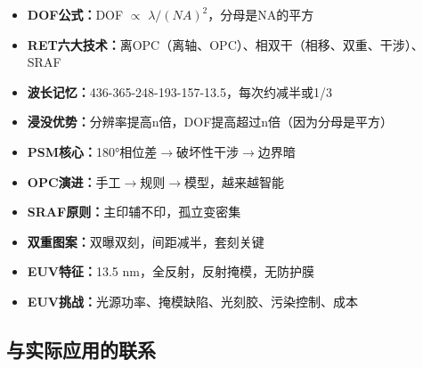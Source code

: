 \documentclass[UTF8,12pt,a4paper]{ctexart}
\begin{document}
\begin{itemize}
    \item \textbf{DOF公式：}DOF $\propto$ $\lambda/(NA)^2$，分母是NA的平方
    \item \textbf{RET六大技术：}离OPC（离轴、OPC）、相双干（相移、双重、干涉）、SRAF
    \item \textbf{波长记忆：}436-365-248-193-157-13.5，每次约减半或1/3
    \item \textbf{浸没优势：}分辨率提高n倍，DOF提高超过n倍（因为分母是平方）
    \item \textbf{PSM核心：}180°相位差$\rightarrow$破坏性干涉$\rightarrow$边界暗
    \item \textbf{OPC演进：}手工$\rightarrow$规则$\rightarrow$模型，越来越智能
    \item \textbf{SRAF原则：}主印辅不印，孤立变密集
    \item \textbf{双重图案：}双曝双刻，间距减半，套刻关键
    \item \textbf{EUV特征：}13.5 nm，全反射，反射掩模，无防护膜
    \item \textbf{EUV挑战：}光源功率、掩模缺陷、光刻胶、污染控制、成本
\end{itemize}

\subsection{与实际应用的联系}
\end{document}
